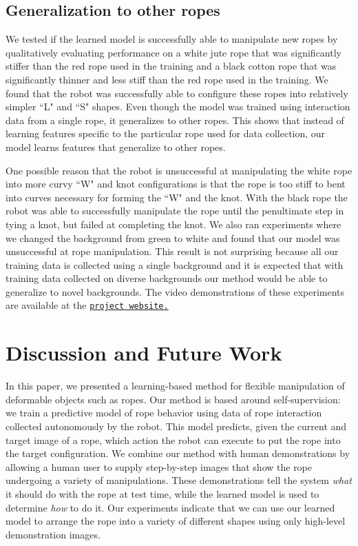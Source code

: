 \documentclass[letterpaper, 10 pt, conference]{ieeeconf}  %
\begin{document}
\subsection{Generalization to other ropes}
We tested if the learned model is successfully able to manipulate new ropes by qualitatively evaluating performance on a white jute rope that was significantly stiffer than the red rope used in the training and a black cotton rope that was significantly thinner and less stiff than the red rope used in the training. We found that the robot was successfully able to configure these ropes into relatively simpler ``L" and ``S" shapes. Even though the model was trained using interaction data from a single rope, it generalizes to other ropes. This shows that instead of learning features specific to the particular rope used for data collection, our model learns features that generalize to other ropes. 

One possible reason that the robot is unsuccessful at manipulating the white rope into more curvy ``W" and knot configurations is that the rope is too stiff to bent into curves necessary for forming the ``W" and the knot. With the black rope the robot was able to successfully manipulate the rope until the penultimate step in tying a knot, but failed at completing the knot. We also ran experiments where we changed the background from green to white and found that our model was unsuccessful at rope manipulation. This result is not surprising because all our training data is collected using a single background and it is expected that with training data collected on diverse backgrounds our method would be able to generalize to novel backgrounds. The video demonstrations of these experiments are available at the \href{https://ropemanipulation.github.io/}{\texttt{project website.}}  

\section{Discussion and Future Work}

In this paper, we presented a learning-based method for flexible manipulation of deformable objects such as ropes. Our method is based around self-supervision: we train a predictive model of rope behavior using data of rope interaction collected autonomously by the robot. This model predicts, given the current and target image of a rope, which action the robot can execute to put the rope into the target configuration. We combine our method with human demonstrations by allowing a human user to supply step-by-step images that show the rope undergoing a variety of manipulations. These demonstrations tell the system \emph{what} it should do with the rope at test time, while the learned model is used to determine \emph{how} to do it. Our experiments indicate that we can use our learned model to arrange the rope into a variety of different shapes using only high-level demonstration images.
\end{document}
